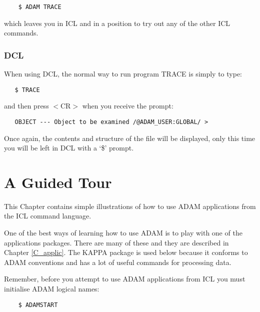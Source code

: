 \begin{small}
\begin{verbatim}
    $ ADAM TRACE
\end{verbatim}
\end{small}

which leaves you in ICL and in a position to try out any of the other ICL
commands.

\subsection{DCL}

When using DCL, the normal way to run program TRACE is simply to type:

\begin{small}
\begin{verbatim}
   $ TRACE
\end{verbatim}
\end{small}

and then press $<$CR$>$ when you receive the prompt:

\begin{small}
\begin{verbatim}
   OBJECT --- Object to be examined /@ADAM_USER:GLOBAL/ >
\end{verbatim}
\end{small}

Once again, the contents and structure of the file will be displayed, only this
time you will be left in DCL with a `\$' prompt.

\chapter {A Guided Tour}
\label{C_tour}

This Chapter contains simple illustrations of how to use ADAM applications from
the ICL command language.

One of the best ways of learning how to use ADAM is to play with one of the
applications packages.
There are many of these and they are described in Chapter \ref{C_applic}. 
The KAPPA package is used below because it conforms to ADAM conventions and
has a lot of useful commands for processing data.

Remember, before you attempt to use ADAM applications from ICL you must
initialise ADAM logical names:

\begin{small}
\begin{verbatim}
    $ ADAMSTART
\end{verbatim}
\end{small}

